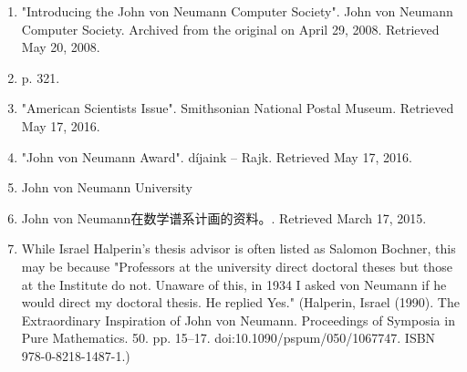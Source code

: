 \begin{enumerate}
\item "Introducing the John von Neumann Computer Society". John von Neumann Computer Society. Archived from the original on April 29, 2008. Retrieved May 20, 2008.
\item  p. 321.
\item "American Scientists Issue". Smithsonian National Postal Museum. Retrieved May 17, 2016.
\item "John von Neumann Award". díjaink – Rajk. Retrieved May 17, 2016.
\item John von Neumann University
\item John von Neumann在数学谱系计画的资料。. Retrieved March 17, 2015.
\item While Israel Halperin's thesis advisor is often listed as Salomon Bochner, this may be because "Professors at the university direct doctoral theses but those at the Institute do not. Unaware of this, in 1934 I asked von Neumann if he would direct my doctoral thesis. He replied Yes." (Halperin, Israel (1990). The Extraordinary Inspiration of John von Neumann. Proceedings of Symposia in Pure Mathematics. 50. pp. 15–17. doi:10.1090/pspum/050/1067747. ISBN 978-0-8218-1487-1.)
\end{enumerate}
